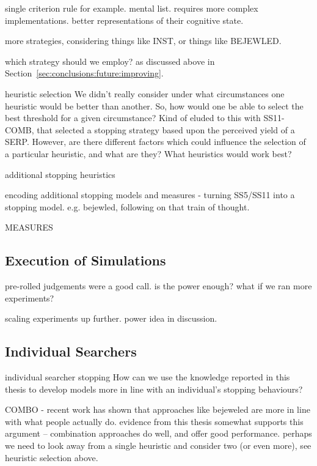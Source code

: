 single criterion rule for example.
mental list.
requires more complex implementations. better representations of their cognitive state.

more strategies, considering things like INST, or things like BEJEWLED.


which strategy should we employ? as discussed above in Section~\ref{sec:conclusions:future:improving}.

heuristic selection
We didn't really consider under what circumstances one heuristic would be better than another. So, how would one be able to select the best threshold for a given circumstance? Kind of eluded to this with SS11-COMB, that selected a stopping strategy based upon the perceived yield of a SERP. However, are there different factors which could influence the selection of a particular heuristic, and what are they? What heuristics would work best?

additional stopping heuristics

encoding additional stopping models and measures
    - turning SS5/SS11 into a stopping model. e.g. bejewled, following on that train of thought.



MEASURES

\subsection{Execution of Simulations}

pre-rolled judgements were a good call.
is the power enough? what if we ran more experiments?

scaling experiments up further.
    power idea in discussion.

\subsection{Individual Searchers}

individual searcher stopping
How can we use the knowledge reported in this thesis to develop models more in line with an individual's stopping behaviours?

COMBO - recent work has shown that approaches like bejeweled are more in line with what people actually do. evidence from this thesis somewhat supports this argument -- combination approaches do well, and offer good performance. perhaps we need to look away from a single heuristic and consider two (or even more), see heuristic selection above.

